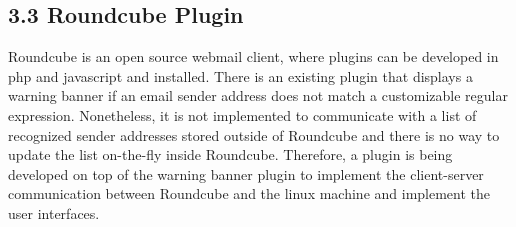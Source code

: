 \documentclass[11pt]{article}
\begin{document}
\subsection*{3.3 \hspace{10pt} Roundcube Plugin}
Roundcube is an open source webmail client, where plugins can be developed in php and javascript and installed. There is an existing plugin that displays a warning banner if an email sender address does not match a customizable regular expression. Nonetheless, it is not implemented to communicate with a list of recognized sender addresses stored outside of Roundcube and there is no way to update the list on-the-fly inside Roundcube. Therefore, a plugin is being developed on top of the warning banner plugin to implement the client-server communication between Roundcube and the linux machine and implement the user interfaces.


%
%
%
%
%
%
%
\end{document}
